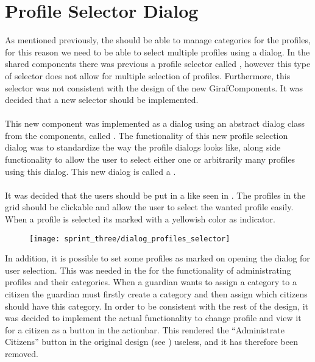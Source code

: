 
\section{Profile Selector Dialog}
\label{sec:profile_selector_dialog}

As mentioned previously, the \ct should be able to manage categories for the profiles, for this reason we need to be able to select multiple profiles using a dialog. In the shared components there was previous a profile selector called , however this type of selector does not allow for multiple selection of profiles. Furthermore, this selector was not consistent with the design of the new GirafComponents. It was decided that a new selector should be implemented.
\\\\
This new component was implemented as a dialog using an abstract dialog class from the components, called . The functionality of this new profile selection dialog was to standardize the way the profile dialogs looks like, along side functionality to allow the user to select either one or arbitrarily many profiles using this dialog. This new dialog is called a .
\\\\
It was decided that the users should be put in a  like seen in . The profiles in the grid should be clickable and allow the user to select the wanted profile easily. When a profile is selected its marked with a yellowish color as indicator.

\begin{figure}[!htbp]
        \centering
        \texttt{[image: sprint\_three/dialog\_profiles\_selector]}
        \caption{}
        \label{fig:dialog_profiles_selector}
\end{figure}

In addition, it is possible to set some profiles as marked on opening the dialog for user selection. This was needed in the \ct for the functionality of administrating profiles and their categories. When a guardian wants to assign a category to a citizen the guardian must firstly create a category and then assign which citizens should have this category. In order to be consistent with the rest of the design, it was decided to implement the actual functionality to change profile and view it for a citizen as a button in the actionbar. This rendered the ``Administrate Citizens'' button in the original design (see ) useless, and it has therefore been removed. 